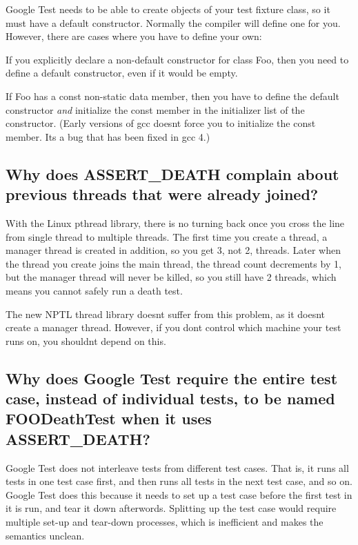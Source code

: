 Google Test needs to be able to create objects of your test fixture class, so it must have a default constructor. Normally the compiler will define one for you. However, there are cases where you have to define your own\+:
\begin{DoxyItemize}
\item If you explicitly declare a non-\/default constructor for class {\ttfamily Foo}, then you need to define a default constructor, even if it would be empty.
\item If {\ttfamily Foo} has a const non-\/static data member, then you have to define the default constructor {\itshape and} initialize the const member in the initializer list of the constructor. (Early versions of {\ttfamily gcc} doesn\textquotesingle{}t force you to initialize the const member. It\textquotesingle{}s a bug that has been fixed in {\ttfamily gcc 4}.)
\end{DoxyItemize}

\subsection*{Why does A\+S\+S\+E\+R\+T\+\_\+\+D\+E\+A\+TH complain about previous threads that were already joined?}

With the Linux pthread library, there is no turning back once you cross the line from single thread to multiple threads. The first time you create a thread, a manager thread is created in addition, so you get 3, not 2, threads. Later when the thread you create joins the main thread, the thread count decrements by 1, but the manager thread will never be killed, so you still have 2 threads, which means you cannot safely run a death test.

The new N\+P\+TL thread library doesn\textquotesingle{}t suffer from this problem, as it doesn\textquotesingle{}t create a manager thread. However, if you don\textquotesingle{}t control which machine your test runs on, you shouldn\textquotesingle{}t depend on this.

\subsection*{Why does Google Test require the entire test case, instead of individual tests, to be named F\+O\+O\+Death\+Test when it uses A\+S\+S\+E\+R\+T\+\_\+\+D\+E\+A\+TH?}

Google Test does not interleave tests from different test cases. That is, it runs all tests in one test case first, and then runs all tests in the next test case, and so on. Google Test does this because it needs to set up a test case before the first test in it is run, and tear it down afterwords. Splitting up the test case would require multiple set-\/up and tear-\/down processes, which is inefficient and makes the semantics unclean.

